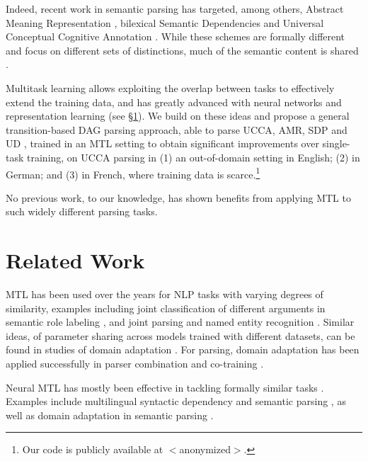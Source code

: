 \documentclass[11pt,a4paper]{article}
\begin{document}
Indeed, recent work in semantic parsing has targeted, among others,
Abstract Meaning Representation \cite[AMR;][]{banarescu2013abstract},
bilexical Semantic Dependencies \cite[SDP;][]{oepen2016towards}
and Universal Conceptual Cognitive Annotation \cite[UCCA;][]{abend2013universal}.
While these schemes are formally different and focus on different sets of distinctions,
much of the semantic content is shared \cite{abend2017state}.

Multitask learning \cite[MTL; ][]{caruana1998multitask} allows exploiting the overlap between tasks
to effectively extend the training data, 
and has greatly advanced with neural networks and representation learning
(see \S\ref{sec:related_work}).
We build on these ideas and propose a general transition-based DAG parsing approach,
able to parse UCCA, AMR, SDP and UD \cite{nivre2016universal},
trained in an MTL setting to obtain significant improvements over single-task training,
on UCCA parsing in (1) an out-of-domain setting in English; 
(2) in German; and (3) in French, where training data is scarce.\footnote{Our code is publicly available at $<$anonymized$>$.}

No previous work, to our knowledge, has shown benefits 
from applying MTL to such widely different parsing tasks.

\section{Related Work}\label{sec:related_work}

MTL has been used over the years for NLP tasks with varying degrees of similarity,
examples including joint classification of different arguments in 
semantic role labeling \cite{toutanova2005joint},
and joint parsing and named entity recognition \cite{Finkel2009JointPA}.
Similar ideas, of parameter sharing across models trained with different datasets,
can be found in studies of domain adaptation \cite{W06-1615,P07-1033,K17-1040}.
For parsing, domain adaptation has been applied successfully in
parser combination and co-training \cite{mcclosky2010automatic,baucom2013domain}.

Neural MTL has mostly been effective in tackling formally similar
tasks \cite{P15-1166,P16-2038,D17-1134}.
Examples include 
multilingual syntactic dependency \cite{Q16-1031,guo2016exploiting}
and semantic parsing \cite{duong2017multilingual},
as well as domain adaptation in semantic parsing \cite{herzig-berant:2017:Short,W17-2607}.
\end{document}
